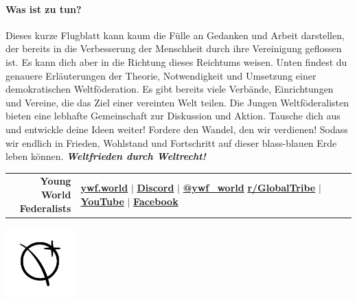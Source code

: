 \documentclass[11pt,a4paper]{article}
\begin{document}
\paragraph{Was ist zu tun?}

Dieses kurze Flugblatt kann kaum die Fülle an Gedanken und Arbeit darstellen, der bereits in die Verbesserung der Menschheit durch ihre Vereinigung geflossen ist.
Es kann dich aber in die Richtung dieses Reichtums weisen.
Unten findest du genauere Erläuterungen der Theorie, Notwendigkeit und Umsetzung einer demokratischen Weltföderation. Es gibt bereits viele Verbände, Einrichtungen und Vereine, die das Ziel einer vereinten Welt teilen.
Die Jungen Weltföderalisten bieten eine lebhafte Gemeinschaft zur Diskussion und Aktion.
Tausche dich aus und entwickle deine Ideen weiter!
Fordere den Wandel, den wir verdienen!
Sodass wir endlich in Frieden, Wohlstand und Fortschritt auf dieser blass-blauen Erde leben können.  \hfill \textbf{\textit{Weltfrieden durch Weltrecht!}}
\vspace{11pt}
\hline

\begin{multicols}{2}
\nocite{*}
\begingroup
{}
\setlength\bibitemsep{2pt}
\printbibliography[heading=none]
\endgroup
\end{multicols}

\begin{minipage}{.75\textwidth}
\begin{shaded*}
\begin{tabular}{r|l}
\makecell[r]{\large{\textbf{Young World}}\\ \large{\textbf{Federalists}}} & \makecell[l]{\textbf{\href{https://www.ywf.world}{ywf.world}} $\mid$ \textbf{\href{https://discord.gg/WyUkQps}{Discord}} $\mid$ \textbf{\href{https://twitter.com/ywf_world}{@ywf\_world}}\\  
\textbf{\href{https://www.reddit.com/r/GlobalTribe/}{r/GlobalTribe}} $\mid$ \textbf{\href{https://www.youtube.com/channel/UCBWca8XnMHF9EELWbz146pg}{YouTube}} $\mid$ \textbf{\href{https://www.facebook.com/YoungWorldFederalists/}{Facebook}}}
\end{tabular}

\end{shaded*}
\end{minipage}%
\begin{minipage}{0.25\textwidth}
\vspace{-30pt}
    \centering
    \includegraphics[height=100px]{ywf.png}

\end{minipage}
\end{document}
